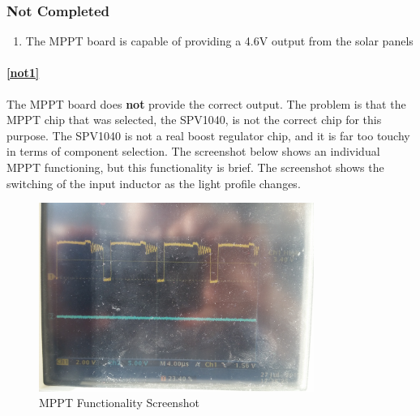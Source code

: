 \documentclass{article}
\numberwithin{figure}{section}
\numberwithin{equation}{section}
\begin{document}
{\subsubsection{Not Completed}\label{vv-not-completed}
\begin{enumerate}[align=left,leftmargin=*,labelindent=0em,label=\textbf{Item \thesubsubsection.\arabic*.},itemindent=0em]
    \item \label{not1} The MPPT board is capable of providing a 4.6V output from the solar panels
\end{enumerate}

\paragraph{\ref{not1}}
The MPPT board does \textbf{not} provide the correct output. The problem is that the MPPT chip that was selected, the SPV1040, is not the correct chip for this purpose. The SPV1040 is not a real boost regulator chip, and it is far too touchy in terms of component selection. The screenshot below shows an individual MPPT functioning, but this functionality is brief. The screenshot shows the switching of the input inductor as the light profile changes.

\begin{figure}[H]
	\centering
	\includegraphics[width=0.8\textwidth]{mppt_screenshot}
	\caption{MPPT Functionality Screenshot}
	\label{fig:mppt_screenshot}
\end{figure}

}
\end{document}

